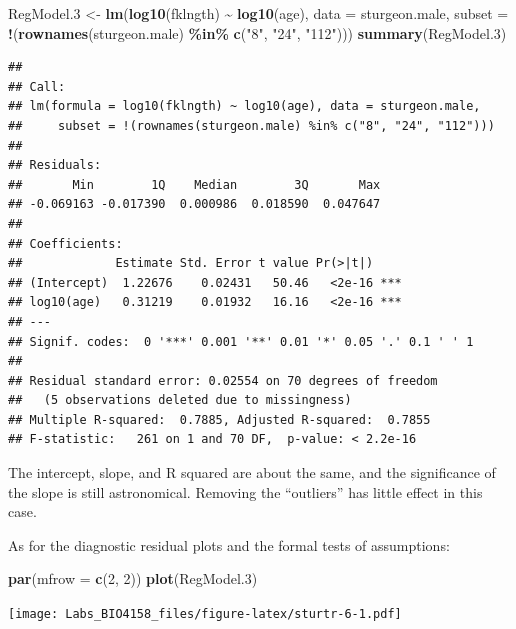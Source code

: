 \documentclass[
  12pt,
]{book}
\newenvironment{Shaded}{\begin{snugshade}}{\end{snugshade}}
\newcommand{\DataTypeTok}[1]{\textcolor[rgb]{0.13,0.29,0.53}{#1}}
\newcommand{\DecValTok}[1]{\textcolor[rgb]{0.00,0.00,0.81}{#1}}
\newcommand{\FloatTok}[1]{\textcolor[rgb]{0.00,0.00,0.81}{#1}}
\newcommand{\KeywordTok}[1]{\textcolor[rgb]{0.13,0.29,0.53}{\textbf{#1}}}
\newcommand{\NormalTok}[1]{#1}
\newcommand{\OperatorTok}[1]{\textcolor[rgb]{0.81,0.36,0.00}{\textbf{#1}}}
\newcommand{\StringTok}[1]{\textcolor[rgb]{0.31,0.60,0.02}{#1}}
\begin{document}
\begin{Shaded}
\begin{Highlighting}[]
\NormalTok{RegModel}\FloatTok{.3}\NormalTok{ \textless{}{-}}\StringTok{ }\KeywordTok{lm}\NormalTok{(}\KeywordTok{log10}\NormalTok{(fklngth) }\OperatorTok{\textasciitilde{}}\StringTok{ }\KeywordTok{log10}\NormalTok{(age), }\DataTypeTok{data =}\NormalTok{ sturgeon.male, }\DataTypeTok{subset =} \OperatorTok{!}\NormalTok{(}\KeywordTok{rownames}\NormalTok{(sturgeon.male) }\OperatorTok{\%in\%}\StringTok{ }\KeywordTok{c}\NormalTok{(}\StringTok{"8"}\NormalTok{, }\StringTok{"24"}\NormalTok{, }\StringTok{"112"}\NormalTok{)))}
\KeywordTok{summary}\NormalTok{(RegModel}\FloatTok{.3}\NormalTok{)}
\end{Highlighting}
\end{Shaded}

\begin{verbatim}
## 
## Call:
## lm(formula = log10(fklngth) ~ log10(age), data = sturgeon.male, 
##     subset = !(rownames(sturgeon.male) %in% c("8", "24", "112")))
## 
## Residuals:
##       Min        1Q    Median        3Q       Max 
## -0.069163 -0.017390  0.000986  0.018590  0.047647 
## 
## Coefficients:
##             Estimate Std. Error t value Pr(>|t|)    
## (Intercept)  1.22676    0.02431   50.46   <2e-16 ***
## log10(age)   0.31219    0.01932   16.16   <2e-16 ***
## ---
## Signif. codes:  0 '***' 0.001 '**' 0.01 '*' 0.05 '.' 0.1 ' ' 1
## 
## Residual standard error: 0.02554 on 70 degrees of freedom
##   (5 observations deleted due to missingness)
## Multiple R-squared:  0.7885, Adjusted R-squared:  0.7855 
## F-statistic:   261 on 1 and 70 DF,  p-value: < 2.2e-16
\end{verbatim}

The intercept, slope, and R squared are about the same, and the significance of the slope is still astronomical. Removing the ``outliers'' has little effect in this case.

As for the diagnostic residual plots and the formal tests of assumptions:

\begin{Shaded}
\begin{Highlighting}[]
\KeywordTok{par}\NormalTok{(}\DataTypeTok{mfrow =} \KeywordTok{c}\NormalTok{(}\DecValTok{2}\NormalTok{, }\DecValTok{2}\NormalTok{))}
\KeywordTok{plot}\NormalTok{(RegModel}\FloatTok{.3}\NormalTok{)}
\end{Highlighting}
\end{Shaded}

\texttt{[image: Labs\_BIO4158\_files/figure-latex/sturtr-6-1.pdf]}
\end{document}
